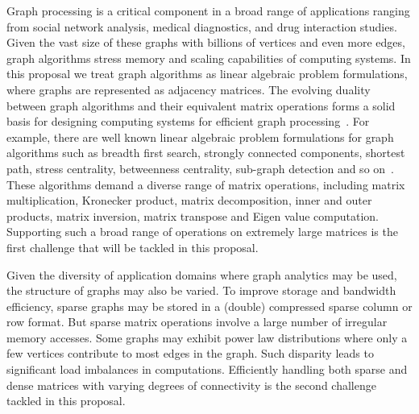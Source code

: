 \noindent
Graph processing is a critical component in a broad range of applications ranging from social network analysis, medical diagnostics, and drug interaction studies.  
Given the vast size of these graphs with billions of vertices and even more edges, graph algorithms stress memory and scaling capabilities of computing systems. 
In this proposal we treat graph algorithms as linear algebraic problem formulations, where graphs are represented as adjacency matrices.  
The evolving duality between graph algorithms and their equivalent matrix operations forms a solid basis for 
designing computing systems %
for efficient graph processing~\cite{graph:primitives}.
For example, there are well known linear algebraic problem formulations for graph algorithms such as breadth first search, strongly connected components, shortest path, stress centrality, betweenness centrality, sub-graph detection and so on~\cite{kepner2011graph}.  
These algorithms demand a diverse range of matrix operations, including matrix multiplication, Kronecker product,  matrix decomposition, inner and outer products, matrix inversion, matrix transpose and Eigen value computation.  
Supporting such a broad range of operations on extremely large matrices is the first challenge that will be tackled in this proposal. 


Given the diversity of application domains where graph analytics may be used, the structure of graphs may also be varied. 
To improve storage and bandwidth efficiency, sparse graphs may be stored in  a (double) compressed sparse column or row format. 
But sparse matrix operations involve a large number of irregular memory accesses.
Some graphs may exhibit power law distributions where only a few vertices contribute to most edges in the graph. 
Such disparity leads to significant load imbalances in computations.  
Efficiently handling both sparse and dense matrices with varying degrees of connectivity is the second challenge tackled in this proposal. 

